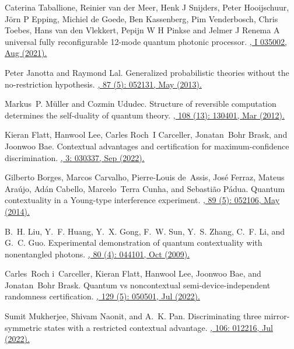 \documentclass[letterpaper,onecolumn,12pt,accepted=2024-01-17]{article}
\begin{document}
\begin{thebibliography}{100}
Caterina Taballione, Reinier van der Meer, Henk J Snijders, Peter Hooijschuur, Jörn P Epping, Michiel de Goede, Ben Kassenberg, Pim Venderbosch, Chris Toebes, Hans van den Vlekkert, Pepijn W H Pinkse and Jelmer J Renema
\newblock A universal fully reconfigurable 12-mode quantum photonic processor.
\href{http://dx.doi.org/10.1088/2633-4356/ac168c}{, I 035002, Aug (2021).}

Peter Janotta and Raymond Lal.
\newblock Generalized probabilistic theories without the no-restriction
  hypothesis.
\href{https://doi.org/10.1103/PhysRevA.87.052131}{, 87 (5): 052131, May (2013).}

Markus~P. M{\"u}ller and Cozmin Ududec.
\newblock Structure of reversible computation determines the self-duality of
  quantum theory.
\href{https://doi.org/10.1103/PhysRevLett.108.130401}{, 108 (13): 130401, Mar (2012).}

Kieran Flatt, Hanwool Lee, Carles Roch~I Carceller, Jonatan~Bohr Brask, and
  Joonwoo Bae.
\newblock Contextual advantages and certification for maximum-confidence
  discrimination.
\href{https://doi.org/10.1103/PRXQuantum.3.030337}{, 3: 030337, Sep (2022).}

Gilberto Borges, Marcos Carvalho, Pierre-Louis de~Assis, Jos{\'{e}} Ferraz,
  Mateus Ara{\'{u}}jo, Ad{\'{a}}n Cabello, Marcelo~Terra Cunha, and
  Sebasti{\~{a}}o P{\'{a}}dua.
\newblock Quantum contextuality in a {Y}oung-type interference experiment.
\href{https://doi.org/10.1103/PhysRevA.89.052106}{, 89 (5): 052106, May (2014).}

B.~H. Liu, Y.~F. Huang, Y.~X. Gong, F.~W. Sun, Y.~S. Zhang, C.~F. Li, and G.~C.
  Guo.
\newblock Experimental demonstration of quantum contextuality with nonentangled
  photons.
\href{https://doi.org/10.1103/PhysRevA.80.044101}{, 80 (4): 044101, Oct (2009).}

Carles~Roch i~Carceller, Kieran Flatt, Hanwool Lee, Joonwoo Bae, and
  Jonatan~Bohr Brask.
\newblock Quantum vs noncontextual semi-device-independent randomness
  certification.
\href{https://doi.org/10.1103/PhysRevLett.129.050501}{, 129 (5): 050501, Jul (2022).}

Sumit Mukherjee, Shivam Naonit, and A.~K. Pan.
\newblock Discriminating three mirror-symmetric states with a restricted contextual advantage.
\href{https://doi.org/10.1103/PhysRevA.106.012216}{, 106: 012216, Jul (2022).}

\end{thebibliography}
\end{document}
